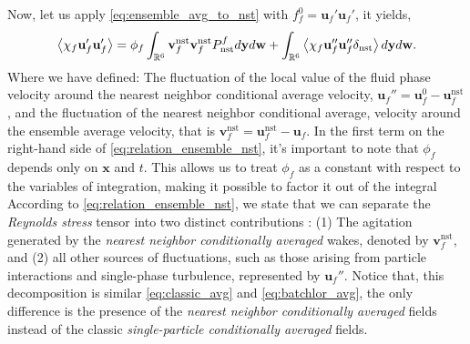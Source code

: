Now, let us apply \ref{eq:ensemble_avg_to_nst} with $f_f^0 = \textbf{u}_f'\textbf{u}_f'$, it yields,
\begin{equation}
    \avg{\chi_f \textbf{u}_f'\textbf{u}_f'}
    = 
    \phi_f
    \int_{\mathbb{R}^6}
    \textbf{v}_f^\text{nst}
    \textbf{v}_f^\text{nst}
    P_\text{nst}^f
    d\textbf{y}
    d\textbf{w}
    + 
    \int_{\mathbb{R}^6}
    \avg{
        \chi_f
        \textbf{u}_f''
        \textbf{u}_f''
        \delta_\text{nst}
    }
    d\textbf{y}
    d\textbf{w}.
    \label{eq:relation_ensemble_nst}
\end{equation}
Where we have defined: 
The fluctuation of the local value of the fluid phase velocity around the nearest neighbor conditional average velocity, $\textbf{u}_f'' = \textbf{u}_f^0 - \textbf{u}_f^\text{nst}$, and the fluctuation of the nearest neighbor conditional average, velocity around the ensemble average velocity, that is $\textbf{v}_f^\text{nst} = \textbf{u}_f^\text{nst} - \textbf{u}_f$. 
In the first term on the right-hand side of \ref{eq:relation_ensemble_nst}, it's important to note that $\phi_f$ depends only on $\textbf{x}$ and $t$. 
This allows us to treat $\phi_f$ as a constant with respect to the variables of integration, making it possible to factor it out of the integral
According to \ref{eq:relation_ensemble_nst}, 
we state that we can separate the \textit{Reynolds stress} tensor into two distinct contributions :  (1) The agitation generated by the \textit{nearest neighbor conditionally averaged} wakes, denoted by $\textbf{v}_f^\text{nst}$, and (2) all other sources of fluctuations, such as those arising from particle interactions and single-phase turbulence, represented by $\textbf{u}_f''$. 
Notice that, this decomposition is similar \ref{eq:classic_avg} and \ref{eq:batchlor_avg}, the only difference is the presence of the \textit{nearest neighbor conditionally averaged} fields instead of the classic \textit{single-particle conditionally averaged} fields. 

